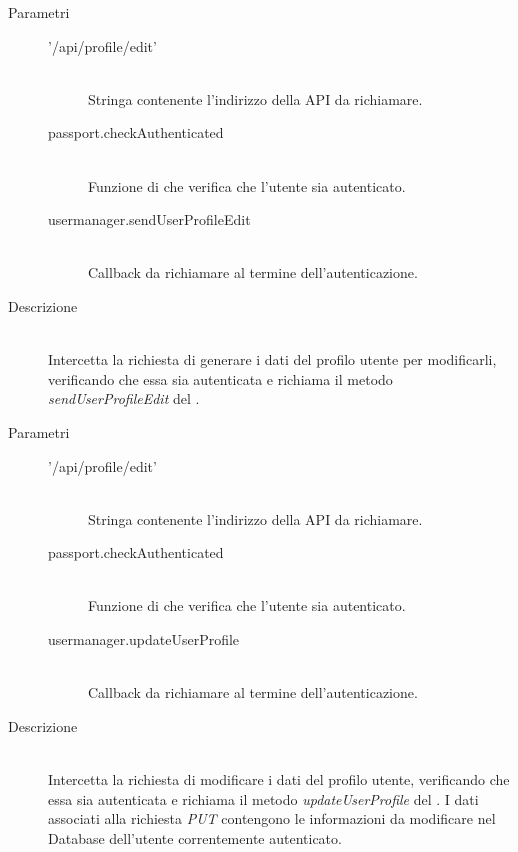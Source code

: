 \begin{description}
\begin{description}
\begin{mldescription}
    \hfill 
   \begin{description}
    \item[Parametri] \hfill
     \begin{description}
      \item['/api/profile/edit'] \hfill \\
      Stringa contenente l'indirizzo della API da richiamare.
      \item[passport.checkAuthenticated] \hfill \\
      Funzione di  che verifica che l'utente sia autenticato.
      \item[usermanager.sendUserProfileEdit] \hfill \\
      Callback da richiamare al termine dell'autenticazione.
     \end{description}
    \item[Descrizione] \hfill \\
   Intercetta la richiesta di generare i dati del profilo utente per modificarli, verificando che essa sia autenticata e richiama il metodo \textit{sendUserProfileEdit} del .
   \end{description} 
   
    \hfill 
   \begin{description}
    \item[Parametri] \hfill
     \begin{description}
      \item['/api/profile/edit'] \hfill \\
      Stringa contenente l'indirizzo della API da richiamare.
      \item[passport.checkAuthenticated] \hfill \\
      Funzione di  che verifica che l'utente sia autenticato.
      \item[usermanager.updateUserProfile] \hfill \\
      Callback da richiamare al termine dell'autenticazione.
     \end{description}
    \item[Descrizione] \hfill \\ 
   Intercetta la richiesta di modificare i dati del profilo utente, verificando che essa sia autenticata e richiama il metodo \textit{updateUserProfile} del . I dati associati alla richiesta \textit{PUT} contengono le informazioni da modificare nel Database dell'utente correntemente autenticato. 
   \end{description}
 

\end{mldescription}
\end{description}
\end{description}
